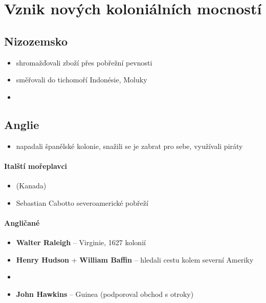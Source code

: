 \section{Vznik nových koloniálních mocností}
\subsection{Nizozemsko}
\begin{itemize}
\item shromažďovali zboží přes pobřežní pevnosti
\item směřovali do tichomoří \ra Indonésie, Moluky
\item {}
\end{itemize}

\subsection{Anglie}
\begin{itemize}
\item napadali španělské kolonie, snažili se je zabrat pro sebe, využívali piráty
\end{itemize}

\paragraph{Italští mořeplavci}
	\begin{itemize}
	\item {} (Kanada)
	\item Sebastian Cabotto \ra severoamerické pobřeží
	
	\end{itemize}


\paragraph{Angličané} 
\begin{itemize}
\item \textbf{Walter Raleigh} -- Virginie, 1627 kolonií
\item \textbf{Henry Hudson} + \textbf{William Baffin} -- hledali cestu kolem severní Ameriky
\item {} 
\item \textbf{John Hawkins} -- Guinea (podporoval obchod s otroky)
\end{itemize}
	
